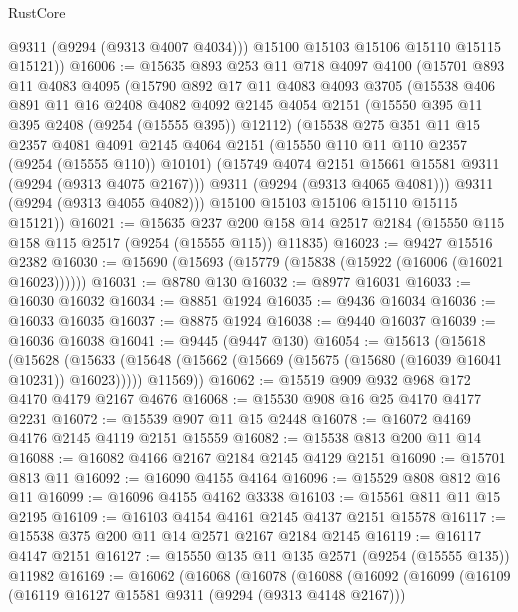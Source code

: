 \begin{lexlean}{RustCore}
\begin{coremodule}
          @9311
          (@9294 (@9313 @4007 @4034)))
        @15100
        @15103
        @15106
        @15110
        @15115
        @15121))
@16006 := @15635
    @893
    @253
    @11
    @718
    @4097
    @4100
    (@15701
      @893
      @11
      @4083
      @4095
      (@15790
        @892
        @17
        @11
        @4083
        @4093
        @3705
        (@15538
          @406
          @891
          @11
          @16
          @2408
          @4082
          @4092
          @2145
          @4054
          @2151
          (@15550 @395 @11 @395 @2408 (@9254 (@15555 @395)) @12112)
          (@15538
            @275
            @351
            @11
            @15
            @2357
            @4081
            @4091
            @2145
            @4064
            @2151
            (@15550 @110 @11 @110 @2357 (@9254 (@15555 @110)) @10101)
            (@15749 @4074 @2151 @15661 @15581 @9311 (@9294 (@9313 @4075 @2167)))
            @9311
            (@9294 (@9313 @4065 @4081)))
          @9311
          (@9294 (@9313 @4055 @4082)))
        @15100
        @15103
        @15106
        @15110
        @15115
        @15121))
@16021 := @15635
    @237
    @200
    @158
    @14
    @2517
    @2184
    (@15550 @115 @158 @115 @2517 (@9254 (@15555 @115)) @11835)
@16023 := @9427 @15516 @2382
@16030 := @15690 (@15693 (@15779 (@15838 (@15922 (@16006 (@16021 @16023))))))
@16031 := @8780 @130
@16032 := @8977 @16031
@16033 := @16030 @16032
@16034 := @8851 @1924
@16035 := @9436 @16034
@16036 := @16033 @16035
@16037 := @8875 @1924
@16038 := @9440 @16037
@16039 := @16036 @16038
@16041 := @9445 (@9447 @130)
@16054 := @15613
    (@15618
      (@15628
        (@15633 (@15648 (@15662 (@15669 (@15675 (@15680 (@16039 @16041 @10231)) @16023)))))
        @11569))
@16062 := @15519 @909 @932 @968 @172 @4170 @4179 @2167 @4676
@16068 := @15530 @908 @16 @25 @4170 @4177 @2231
@16072 := @15539 @907 @11 @15 @2448
@16078 := @16072 @4169 @4176 @2145 @4119 @2151 @15559
@16082 := @15538 @813 @200 @11 @14
@16088 := @16082 @4166 @2167 @2184 @2145 @4129 @2151
@16090 := @15701 @813 @11
@16092 := @16090 @4155 @4164
@16096 := @15529 @808 @812 @16 @11
@16099 := @16096 @4155 @4162 @3338
@16103 := @15561 @811 @11 @15 @2195
@16109 := @16103 @4154 @4161 @2145 @4137 @2151 @15578
@16117 := @15538 @375 @200 @11 @14 @2571 @2167 @2184 @2145
@16119 := @16117 @4147 @2151
@16127 := @15550 @135 @11 @135 @2571 (@9254 (@15555 @135)) @11982
@16169 := @16062
    (@16068
      (@16078
        (@16088
          (@16092
            (@16099
              (@16109
                (@16119 @16127 @15581 @9311 (@9294 (@9313 @4148 @2167)))

\end{coremodule}
\end{lexlean}
